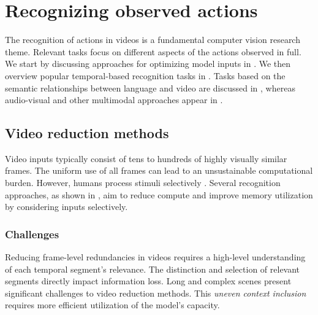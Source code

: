 \section{Recognizing observed actions}
\label{sec:recognition}

The recognition of actions in videos is a fundamental computer vision research theme. Relevant tasks focus on different aspects of the actions observed in full. We start by discussing approaches for optimizing model inputs in . We then overview popular temporal-based recognition tasks in . Tasks based on the semantic relationships between language and video are discussed in , whereas audio-visual and other multimodal approaches appear in . 

\subsection{Video reduction methods}
\label{sec:recognition::inputs}


Video inputs typically consist of tens to hundreds of highly visually similar frames. The uniform use of all frames can lead to an unsustainable computational burden. However, humans process stimuli selectively . 
Several recognition approaches, as shown in , aim to reduce compute and improve memory utilization by considering inputs selectively.


\subsubsection{Challenges}
\label{sec:recognition::challenges} 

Reducing frame-level redundancies in videos requires a high-level understanding of each temporal segment's relevance. The distinction and selection of relevant segments directly impact information loss. Long and complex scenes present significant challenges to video reduction methods. This \textit{uneven context inclusion} requires more efficient utilization of the model's capacity.

